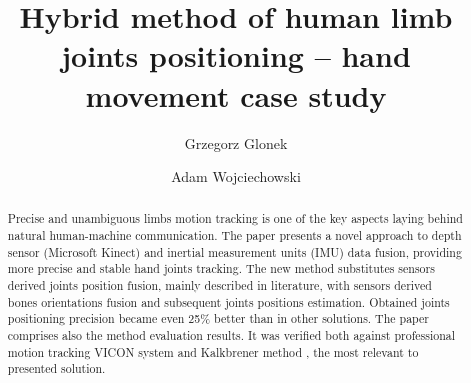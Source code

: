 \documentclass[9pt]{llncs}
\begin{document}
\title{Hybrid method of human limb joints positioning -- hand movement case study}
%
\author{Grzegorz Glonek \and Adam Wojciechowski}
%
%
%

\maketitle              %

\begin{abstract}
	Precise and unambiguous limbs motion tracking is one of the key aspects laying behind natural human-machine communication. The paper presents a novel approach to depth sensor (Microsoft Kinect) and inertial measurement units (IMU) data fusion, providing more precise and stable hand joints tracking. The new method substitutes sensors derived joints position fusion, mainly described in literature, with sensors derived bones orientations fusion and subsequent joints positions estimation. Obtained joints positioning precision became even 25\% better than in other solutions. The paper comprises also the method evaluation results. It was verified both against professional motion tracking VICON system and Kalkbrener method \cite{Kalkbrenner2014}, the most relevant to presented solution.
\end{abstract}
\end{document}
